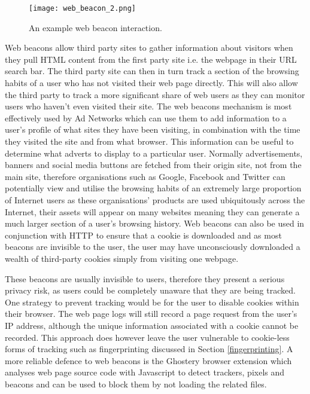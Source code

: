 \documentclass[12pt]{article}
\begin{document}
\begin{figure}[H]
    \centering
    \texttt{[image: web\_beacon\_2.png]}
    \caption{An example web beacon interaction.}
    \label{fig:web_beacons}
\end{figure}

Web beacons allow third party sites to gather information about visitors when they pull HTML content from the first party site i.e. the webpage in their URL search bar. The third party site can then in turn track a section of the browsing habits of a user who has not visited their web page directly. This will also allow the third party to track a more significant share of web users as they can monitor users who haven't even visited their site. The web beacons mechanism is most effectively used by Ad Networks which can use them to add information to a user's profile of what sites they have been visiting, in combination with the time they visited the site and from what browser. This information can be useful to determine what adverts to display to a particular user. Normally advertisements, banners and social media buttons are fetched from their origin site, not from the main site, therefore organisations such as Google, Facebook and Twitter can potentially view and utilise the browsing habits of an extremely large proportion of Internet users as these organisations' products are used ubiquitously across the Internet, their assets will appear on many websites meaning they can generate a much larger section of a user's browsing history. Web beacons can also be used in conjunction with HTTP to ensure that a cookie is downloaded and as most beacons are invisible to the user, the user may have unconsciously downloaded a wealth of third-party cookies simply from visiting one webpage. \newline

These beacons are usually invisible to users, therefore they present a serious privacy risk, as users could be completely unaware that they are being tracked. One strategy to prevent tracking would be for the user to disable cookies within their browser. The web page logs will still record a page request from the user's IP address, although the unique information associated with a cookie cannot be recorded. This approach does however leave the user vulnerable to cookie-less forms of tracking such as fingerprinting discussed in Section \ref{fingerprinting}. A more reliable defence to web beacons is the Ghostery browser extension which analyses web page source code with Javascript to detect trackers, pixels and beacons and can be used to block them by not loading the related files. 
\end{document}
